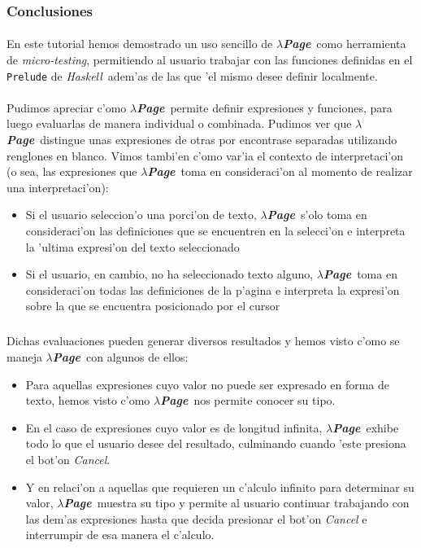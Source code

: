 \documentclass[a4paper]{article}
\newcommand{\haskell}{\textsl{Haskell}}
\newcommand{\hpage}{\textbf{\textsl{$\lambda$Page}}}
\begin{document}
\newpage
\subsubsection{Conclusiones}
\paragraph{}En este tutorial hemos demostrado un uso sencillo de \hpage\ como herramienta de \textsl{micro-testing}, permitiendo al usuario trabajar con las funciones definidas en el \texttt{Prelude} de \haskell\ adem'as de las que 'el mismo desee definir localmente.
\paragraph{}Pudimos apreciar c'omo \hpage\ permite definir expresiones y funciones, para luego evaluarlas de manera individual o combinada.  Pudimos ver que \hpage\ distingue unas expresiones de otras por encontrase separadas utilizando renglones en blanco.  Vimos tambi'en c'omo var'ia el contexto de interpretaci'on (o sea, las expresiones que \hpage\ toma en consideraci'on al momento de realizar una interpretaci'on):
\begin{itemize}
	\item Si el usuario seleccion'o una porci'on de texto, \hpage\ s'olo toma en consideraci'on las definiciones que se encuentren en la selecci'on e interpreta la 'ultima expresi'on del texto seleccionado
	\item Si el usuario, en cambio, no ha seleccionado texto alguno, \hpage\ toma en consideraci'on todas las definiciones de la p'agina e interpreta la expresi'on sobre la que se encuentra posicionado por el cursor
\end{itemize}
\subparagraph{}Dichas evaluaciones pueden generar diversos resultados y hemos visto c'omo se maneja \hpage\ con algunos de ellos:
\begin{itemize}
	\item Para aquellas expresiones cuyo valor no puede ser expresado en forma de texto, hemos visto c'omo \hpage\ nos permite conocer su tipo.
	\item En el caso de expresiones cuyo valor es de longitud infinita, \hpage\ exhibe todo lo que el usuario desee del resultado, culminando cuando 'este presiona el bot'on \textsl{Cancel}.
	\item Y en relaci'on a aquellas que requieren un c'alculo infinito para determinar su valor, \hpage\ muestra su tipo y permite al usuario continuar trabajando con las dem'as expresiones hasta que decida presionar el bot'on \textsl{Cancel} e interrumpir de esa manera el c'alculo.
\end{itemize}
\end{document}

